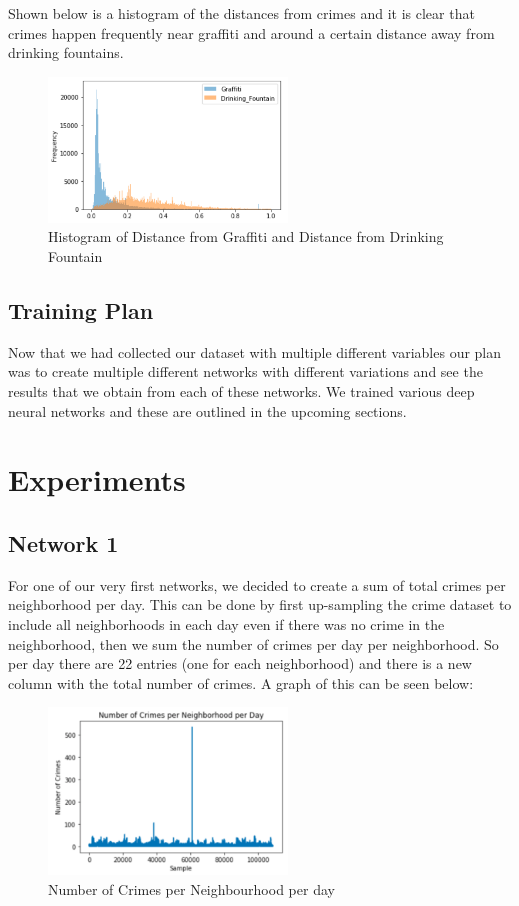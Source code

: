 \documentclass[conference]{IEEEtran}
\begin{document}
Shown below is a histogram of the distances from crimes and it is clear that crimes happen frequently near graffiti and around a certain distance away from
drinking fountains.

\begin{figure}[H]
  \centering
  \captionsetup{justification=centering}
  \centering
  \includegraphics[width=2.5in]{1.png}
  \caption{Histogram of Distance from Graffiti and Distance from Drinking Fountain}  
  \label{1}
\end{figure}

\subsection{Training Plan}

Now that we had collected our dataset with multiple different variables our plan was to create multiple different networks with different variations and see
the results that we obtain from each of these networks. We trained various deep neural networks and these are outlined in the upcoming sections.

\section{Experiments}

\subsection{Network 1 \cite{Network_1}}

For one of our very first networks, we decided to create a sum of total crimes per neighborhood per day.
This can be done by first up-sampling the crime dataset to include all neighborhoods in each day even if there was no crime in the neighborhood,
then we sum the number of crimes per day per neighborhood. So per day there are 22 entries (one for each neighborhood) and there is a new column with the
total number of crimes. A graph of this can be seen below:

\begin{figure}[H]
  \centering
  \captionsetup{justification=centering}
  \centering
  \includegraphics[width=2.5in]{4.png}
  \caption{Number of Crimes per Neighbourhood per day}  
  \label{1}
\end{figure}
\end{document}
